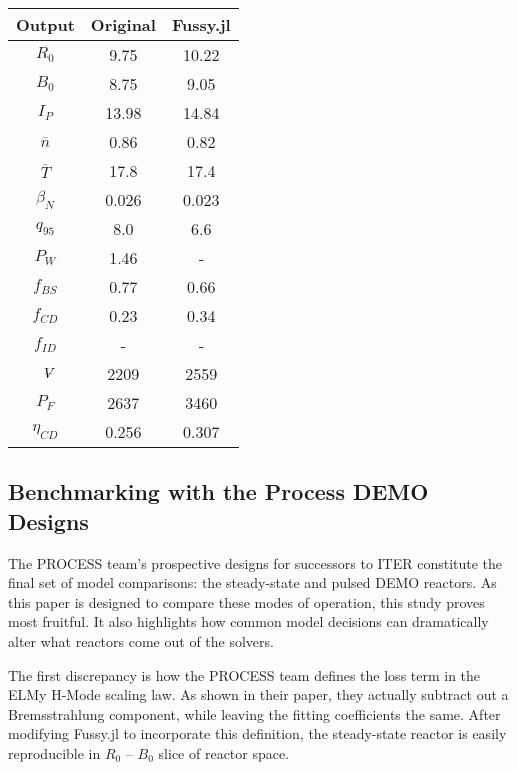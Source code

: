 \begin{table}[h!]
\begin{subtable}[t]{0.5\textwidth}
\begin{tabular}{ c|c|c }
Output           & Original         & Fussy.jl        \\
\hline
$R_{0}$          & 9.75             & 10.22           \\
$B_{0}$          & 8.75             & 9.05           \\
$I_{P}$          & 13.98            & 14.84           \\
$\overline n$    & 0.86             & 0.82          \\
$\overline T$    & 17.8             & 17.4           \\
$\beta_{N}$       & 0.026            & 0.023          \\
$q_{95}$         & 8.0              & 6.6           \\
$P_{W}$          & 1.46             & -            \\
$f_{BS}$         & 0.77             & 0.66           \\
$f_{CD}$         & 0.23             & 0.34           \\
$f_{ID}$         & -              & -             \\
$\volume$         & 2209           & 2559          \\
$P_{F}$          & 2637           & 3460          \\
$\eta_{CD}$      & 0.256            & 0.307           \\

\end{tabular}
\end{subtable}
\hfill
\hfill
\end{table}

\newpage

\subsection{Benchmarking with the Process DEMO Designs}

The PROCESS team's prospective designs for successors to ITER constitute the final set of model comparisons: the steady-state and pulsed DEMO reactors. As this paper is designed to compare these modes of operation, this study proves most fruitful. It also highlights how common model decisions can dramatically alter what reactors come out of the solvers.

The first discrepancy is how the PROCESS team defines the loss term in the ELMy H-Mode scaling law. As shown in their paper, they actually subtract out a Bremsstrahlung component, while leaving the fitting coefficients the same. \cite{process} After modifying Fussy.jl to incorporate this definition, the steady-state reactor is easily reproducible in $R_0$ -- $B_0$ slice of reactor space.

